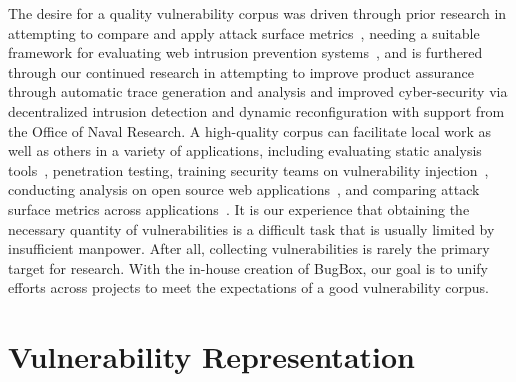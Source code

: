 \documentclass[letterpaper,twocolumn,10pt]{article}
\begin{document}
The desire for a quality vulnerability corpus was driven through prior research in attempting to compare and apply attack surface metrics~\cite{Stuckman:2012:CAA:2372225.2372229}, needing a suitable framework for evaluating web intrusion prevention systems~\cite{Stuckman:2011:TEW:2195220.2195671}, and is furthered through our continued research in attempting to improve product assurance through automatic trace generation and analysis and improved cyber-security via decentralized intrusion detection and dynamic reconfiguration with support from the Office of Naval Research.  A high-quality corpus can facilitate local work as well as others in a variety of applications, including evaluating static analysis tools~\cite{Zitser:2004:TSA:1041685.1029911}, penetration testing, training security teams on vulnerability injection~\cite{4725309}, conducting analysis on open source web applications~\cite{DBLP:journals/ese/HuynhM10}, and comparing attack surface metrics across applications~\cite{Stuckman:2012:CAA:2372225.2372229}.  It is our experience that obtaining the necessary quantity of vulnerabilities is a difficult task that is usually limited by insufficient manpower. After all, collecting vulnerabilities is rarely the primary target for research. With the in-house creation of BugBox, our goal is to unify efforts across projects to meet the expectations of a good vulnerability corpus. 



\section{Vulnerability Representation}
\end{document}
